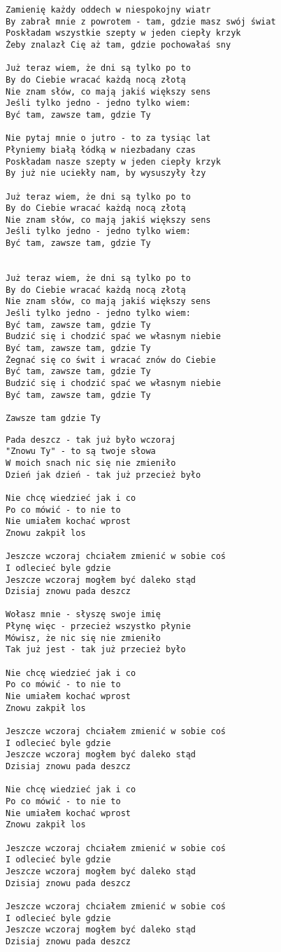 \documentclass[12pt]{article}
\begin{document}
\begin{verbatim}
Zamienię każdy oddech w niespokojny wiatr
By zabrał mnie z powrotem - tam, gdzie masz swój świat
Poskładam wszystkie szepty w jeden ciepły krzyk
Żeby znalazł Cię aż tam, gdzie pochowałaś sny

Już teraz wiem, że dni są tylko po to
By do Ciebie wracać każdą nocą złotą
Nie znam słów, co mają jakiś większy sens
Jeśli tylko jedno - jedno tylko wiem:
Być tam, zawsze tam, gdzie Ty

Nie pytaj mnie o jutro - to za tysiąc lat
Płyniemy białą łódką w niezbadany czas
Poskładam nasze szepty w jeden ciepły krzyk
By już nie uciekły nam, by wysuszyły łzy

Już teraz wiem, że dni są tylko po to
By do Ciebie wracać każdą nocą złotą
Nie znam słów, co mają jakiś większy sens
Jeśli tylko jedno - jedno tylko wiem:
Być tam, zawsze tam, gdzie Ty


Już teraz wiem, że dni są tylko po to
By do Ciebie wracać każdą nocą złotą
Nie znam słów, co mają jakiś większy sens
Jeśli tylko jedno - jedno tylko wiem:
Być tam, zawsze tam, gdzie Ty
Budzić się i chodzić spać we własnym niebie
Być tam, zawsze tam, gdzie Ty
Żegnać się co świt i wracać znów do Ciebie
Być tam, zawsze tam, gdzie Ty
Budzić się i chodzić spać we własnym niebie
Być tam, zawsze tam, gdzie Ty

Zawsze tam gdzie Ty
\end{verbatim}
\clearpage

\begin{verbatim}
Pada deszcz - tak już było wczoraj
"Znowu Ty" - to są twoje słowa
W moich snach nic się nie zmieniło
Dzień jak dzień - tak już przecież było

Nie chcę wiedzieć jak i co
Po co mówić - to nie to
Nie umiałem kochać wprost
Znowu zakpił los

Jeszcze wczoraj chciałem zmienić w sobie coś
I odlecieć byle gdzie
Jeszcze wczoraj mogłem być daleko stąd
Dzisiaj znowu pada deszcz

Wołasz mnie - słyszę swoje imię
Płynę więc - przecież wszystko płynie
Mówisz, że nic się nie zmieniło
Tak już jest - tak już przecież było

Nie chcę wiedzieć jak i co
Po co mówić - to nie to
Nie umiałem kochać wprost
Znowu zakpił los

Jeszcze wczoraj chciałem zmienić w sobie coś
I odlecieć byle gdzie
Jeszcze wczoraj mogłem być daleko stąd
Dzisiaj znowu pada deszcz

Nie chcę wiedzieć jak i co
Po co mówić - to nie to
Nie umiałem kochać wprost
Znowu zakpił los

Jeszcze wczoraj chciałem zmienić w sobie coś
I odlecieć byle gdzie
Jeszcze wczoraj mogłem być daleko stąd
Dzisiaj znowu pada deszcz

Jeszcze wczoraj chciałem zmienić w sobie coś
I odlecieć byle gdzie
Jeszcze wczoraj mogłem być daleko stąd
Dzisiaj znowu pada deszcz
\end{verbatim}
\clearpage
\end{document}
